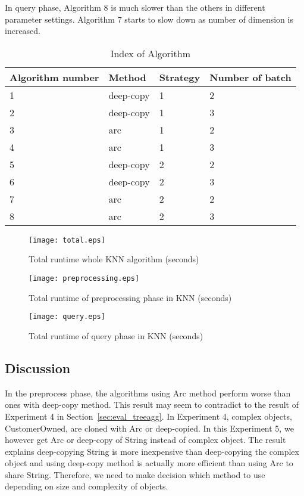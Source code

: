 In query phase, Algorithm 8 is much slower than the others in different parameter settings.
Algorithm 7 starts to slow down as number of dimension is increased. 


\begin{table}
    \renewcommand{\arraystretch}{1.2}
    \begin{tabular}{|l|l|l|l|}
    \hline
    Algorithm number & Method    & Strategy & Number of batch \\ \hline
    1                & deep-copy & 1        & 2               \\ \hline
    2                & deep-copy & 1        & 3               \\ \hline
    3                & arc       & 1        & 2               \\ \hline
    4                & arc       & 1        & 3               \\ \hline
    5                & deep-copy & 2        & 2               \\ \hline
    6                & deep-copy & 2        & 3               \\ \hline
    7                & arc       & 2        & 2               \\ \hline
    8                & arc       & 2        & 3               \\ \hline
    \end{tabular}
    \caption{Index of Algorithm}
    \label{tab:algorithm}
 \end{table}

\begin{figure}[htb]
    \texttt{[image: total.eps]}
    \caption{Total runtime whole KNN algorithm (seconds)}
    \label{fig:total}
\end{figure}

\begin{figure}[htb]
    \texttt{[image: preprocessing.eps]}
    \caption{Total runtime of preprocessing phase in KNN (seconds)}
    \label{fig:preprocess}
\end{figure}


\begin{figure}[htb]
    \texttt{[image: query.eps]}
    \caption{Total runtime of query phase in KNN (seconds)}
    \label{fig:query}
\end{figure}


\subsection{Discussion}
\label{sec:history}
In the preprocess phase, the algorithms using Arc method perform worse than ones with deep-copy method. 
This result may seem to contradict to the result of Experiment 4 in Section~\ref{sec:eval_treeagg}.
In Experiment 4, complex objects, CustomerOwned, are cloned with Arc or deep-copied. 
In this Experiment 5, we however get Arc or deep-copy of String instead of complex object.
The result explains deep-copying String is more inexpensive than deep-copying the complex object and 
using deep-copy method is actually more efficient than using Arc to share String. 
Therefore, we need to make decision which method to use depending on size and complexity of objects.

